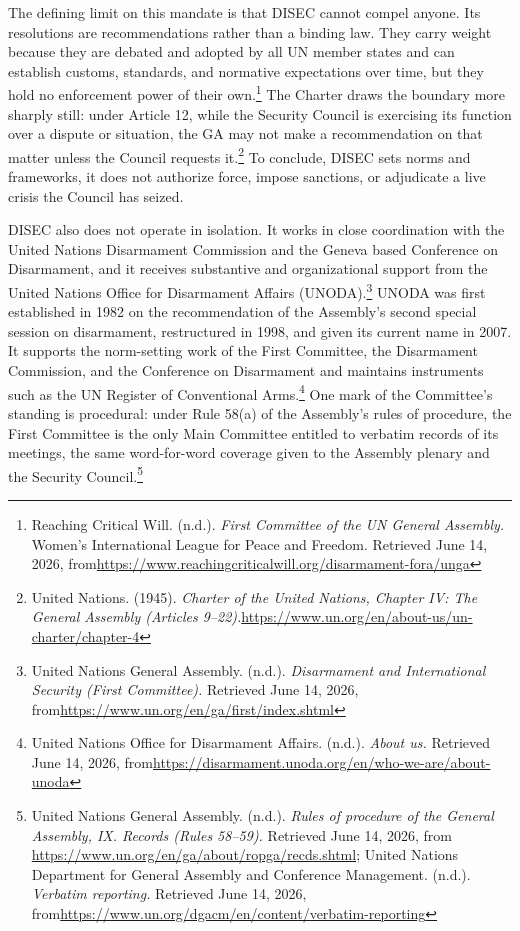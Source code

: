 The defining limit on this mandate is that DISEC cannot compel anyone. Its resolutions are recommendations rather than a binding law. They carry weight because they are debated and adopted by all UN member states and can establish customs, standards, and normative expectations over time, but they hold no enforcement power of their own.\footnote{Reaching Critical Will. (n.d.). \emph{First Committee of the UN General Assembly.} Women's International League for Peace and Freedom. Retrieved June 14, 2026, from\url{https://www.reachingcriticalwill.org/disarmament-fora/unga}} The Charter draws the boundary more sharply still: under Article 12, while the Security Council is exercising its function over a dispute or situation, the GA may not make a recommendation on that matter unless the Council requests it.\footnote{United Nations. (1945). \emph{Charter of the United Nations, Chapter IV: The General Assembly (Articles 9–22).}\url{https://www.un.org/en/about-us/un-charter/chapter-4}} To conclude, DISEC sets norms and frameworks, it does not authorize force, impose sanctions, or adjudicate a live crisis the Council has seized.

DISEC also does not operate in isolation. It works in close coordination with the United Nations Disarmament Commission and the Geneva based Conference on Disarmament, and it receives substantive and organizational support from the United Nations Office for Disarmament Affairs (UNODA).\footnote{United Nations General Assembly. (n.d.). \emph{Disarmament and International Security (First Committee).} Retrieved June 14, 2026, from\url{https://www.un.org/en/ga/first/index.shtml}} UNODA was first established in 1982 on the recommendation of the Assembly’s second special session on disarmament, restructured in 1998, and given its current name in 2007. It supports the norm-setting work of the First Committee, the Disarmament Commission, and the Conference on Disarmament and maintains instruments such as the UN Register of Conventional Arms.\footnote{United Nations Office for Disarmament Affairs. (n.d.). \emph{About us.} Retrieved June 14, 2026, from\url{https://disarmament.unoda.org/en/who-we-are/about-unoda}} One mark of the Committee’s standing is procedural: under Rule 58(a) of the Assembly's rules of procedure, the First Committee is the only Main Committee entitled to verbatim records of its meetings, the same word-for-word coverage given to the Assembly plenary and the Security Council.\footnote{United Nations General Assembly. (n.d.). \emph{Rules of procedure of the General Assembly, IX. Records (Rules 58–59).} Retrieved June 14, 2026, from \url{https://www.un.org/en/ga/about/ropga/recds.shtml}; United Nations Department for General Assembly and Conference Management. (n.d.). \emph{Verbatim reporting.} Retrieved June 14, 2026, from\url{https://www.un.org/dgacm/en/content/verbatim-reporting}}

